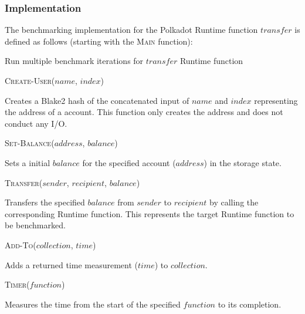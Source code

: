 \documentclass[11pt,a4paper]{article}
\newcommand{\SubItem}[1]{
    {\setlength\itemindent{15pt} \item[-] #1}
}
\begin{document}
\subsubsection*{Implementation}
The benchmarking implementation for the Polkadot Runtime function $transfer$ is defined as
follows (starting with the \textsc{Main} function):
\newline


\begin{algorithm}[H]\label{sec:algo-benchmark-transfer}
  \caption{Run multiple benchmark iterations for $transfer$ Runtime function}
  \SetAlgoLined
  \BlankLine
  \BlankLine
\end{algorithm}

\begin{itemize}
  \item \textsc{Create-User($name$, $index$)}
      \SubItem{Creates a Blake2 hash of the concatenated input of $name$ and $index$ representing
      the address of a account. This function only creates the address and does not conduct any I/O.}
  \item \textsc{Set-Balance($address$, $balance$)}
      \SubItem{Sets a initial $balance$ for the specified account ($address$) in the storage state.}
  \item \textsc{Transfer($sender$, $recipient$, $balance$)}
      \SubItem{Transfers the specified $balance$ from $sender$ to $recipient$ by calling the
      corresponding Runtime function. This represents the target Runtime function to be benchmarked.}
  \item \textsc{Add-To($collection$, $time$)}
      \SubItem{Adds a returned time measurement ($time$) to $collection$.}
  \item \textsc{Timer($function$)}
      \SubItem{Measures the time from the start of the specified $function$ to its completion.}
\end{itemize}
\end{document}

